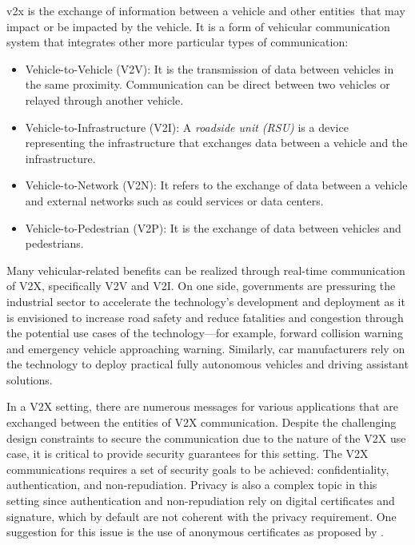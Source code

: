 \gls{v2x} is the exchange of information between a vehicle and other entities that may impact or be impacted by the vehicle. It is a form of vehicular communication system that integrates other more particular types of communication:
\begin{itemize}
	\item Vehicle-to-Vehicle (V2V): It is the transmission of data between vehicles in the same proximity. Communication can be direct between two vehicles or relayed through another vehicle. 
	\item Vehicle-to-Infrastructure (V2I): A \textit{roadside unit (RSU)} is a device representing the infrastructure that exchanges data between a vehicle and the infrastructure.
	\item Vehicle-to-Network (V2N): It refers to the exchange of data between a vehicle and external networks such as could services or data centers.
	\item Vehicle-to-Pedestrian (V2P): It is the exchange of data between vehicles and pedestrians.
\end{itemize}
Many vehicular-related benefits can be realized through real-time communication of V2X, specifically V2V and V2I. On one side, governments are pressuring the industrial sector to accelerate the technology's development and deployment as it is envisioned to increase road safety and reduce fatalities and congestion through the potential use cases of the technology---for example, forward collision warning and emergency vehicle approaching warning. Similarly, car manufacturers rely on the technology to deploy practical fully autonomous vehicles and driving assistant solutions. 
\par
In a V2X setting, there are numerous messages for various applications that are exchanged between the entities of V2X communication. Despite the challenging design constraints to secure the communication due to the nature of the V2X use case, it is critical to provide security guarantees for this setting. The V2X communications requires a set of security goals to be achieved: confidentiality, authentication, and non-repudiation. Privacy is also a complex topic in this setting since authentication and non-repudiation rely on digital certificates and signature, which by default are not coherent with the privacy requirement. One suggestion for this issue is the use of anonymous certificates as proposed by \cite{8275624}.

